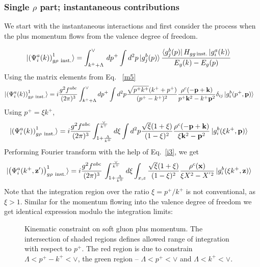 \documentclass[aps,prd,amsmath,amssymb,nofootinbib]{revtex4-2}
\def\v#1{\mathbf{#1}}
\numberwithin{equation}{section}
\begin{document}
\subsubsection{Single $\rho$ part; instantaneous contributions}
We start with the instantaneous interactions and   first consider  the process when the plus momentum flows from the valence degree of freedom. 
\begin{figure}[h]
\end{figure}
\begin{align}\label{oneginst1}
  \ket{ \left(\Psi^{a}_{i}(k) \right)^{1}_{g \rho\ {\rm inst.} } }
   & = \int_{k^{+}+\Lambda}^{\vee}\,
   d p^+ \int d^2p %
   \ket{g_{j}^{b}(p)} 
   \frac{ \bra{g_{j}^{b}(p)}H_{gg\,\text{inst.}}\ket{g_{i}^{a}(k)}}{E_{g}(k)-E_{g}(p)}
\end{align}
Using the matrix elements from Eq.~ \eqref{m5}
\begin{align}\label{oneginst11}
\ket{ \left(\Psi^{a}_{i}(k) \right)^{1}_{g \rho\ {\rm inst.} } }   & = i \frac{g^2 f^{abc}}{(2\pi)^3} 
   \int_{k^+ + \Lambda}^{\vee} %
   d p^+ \int d^2p %
   \frac{\sqrt{p^{+}k^{+}} (k^++p^+) } {(p^+-k^+)^2} \frac{\rho^c(-\v{p}+\v{k})}{p^{+}\v{k}^2 - k^{+}\v{p}^2} \delta_{ij}
   \ket{g_{i}^{b}(p^{+},\v{p})}
\end{align}
Using $p^{+} = \xi k^{+}$,
\begin{align}
 \ket{ \left(\Psi^{a}_{i}(k) \right)^{1}_{g \rho\ {\rm inst.} } }   & = i \frac{g^2 f^{abc}}{(2\pi)^3} 
   \int_{ 1 + \frac{\Lambda}{k^+}   }^{  \frac{\vee}{k^+} } %
   d \xi \int d^2p %
   \frac{\sqrt{\xi} (1+\xi) } {(1-\xi)^2} \frac{\rho^c(-\v{p}+\v{k})}{\xi \v{k}^2 - \v{p}^2} 
   \ket{g_{i}^{b}(\xi k^+,\v{p})} 
\end{align}
Performing Fourier transform with the help of Eq.~\eqref{i3}, we get 
\begin{align}%
  \label{Eq:onegluoninstX1}
  \ket{ \left(\Psi^{a}_{i}(k^+, \v{z}') \right)^{1}_{g \rho\ {\rm inst.} } }%
   &= 
   i \frac{g^2 f^{abc}}{(2\pi)^3}\, \int_{ 1 + \frac{\Lambda}{k^+}   }^{  \frac{\vee}{k^+} } %
   d \xi  \int_{x,z} %
   \frac{\sqrt{\xi} (1+\xi) } {(1-\xi)^2} \frac{\rho^c(\v{x})}{\xi X^{2} - X^{'2} } 
   \ket{g_{i}^{b}(\xi k^+,\v{z})} 
\end{align}
Note that the integration region over the ratio $\xi = p^+/k^+$ is not conventional, as $\xi>1$. Similar for the  momentum flowing into the valence degree of freedom we get identical expression modulo the integration limits:
\begin{figure}
\caption{Kinematic constraint on soft gluon plus momentum. The intersection of shaded regions defines allowed range of integration with respect to $p^+$.
  The red region is due to constrain $ \Lambda < p^+ - k^+ < \vee $, the green region --  $ \Lambda < p^+  < \vee $
and  $ \Lambda <  k^+ < \vee$.
}
\end{figure}
\end{document}
